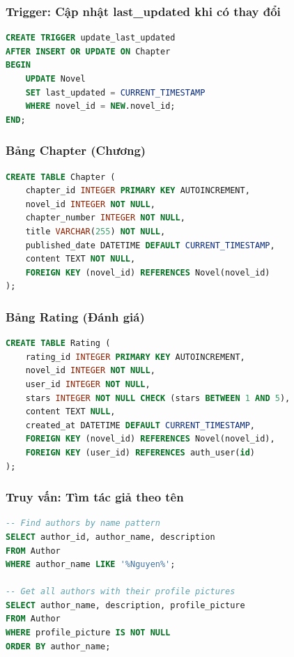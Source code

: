 \documentclass[12pt,aspectratio=169,handout]{beamer}
\begin{document}
\begin{frame}[fragile]
\frametitle{Trigger: Cập nhật last_updated khi có thay đổi}
\begin{lstlisting}[language=SQL, basicstyle=\small\ttfamily]
CREATE TRIGGER update_last_updated
AFTER INSERT OR UPDATE ON Chapter
BEGIN
    UPDATE Novel
    SET last_updated = CURRENT_TIMESTAMP
    WHERE novel_id = NEW.novel_id;
END;
\end{lstlisting}
\end{frame}

\begin{frame}[fragile]
\frametitle{Bảng Chapter (Chương)}
\begin{lstlisting}[language=SQL, basicstyle=\small\ttfamily]
CREATE TABLE Chapter (
    chapter_id INTEGER PRIMARY KEY AUTOINCREMENT,
    novel_id INTEGER NOT NULL,
    chapter_number INTEGER NOT NULL,
    title VARCHAR(255) NOT NULL,
    published_date DATETIME DEFAULT CURRENT_TIMESTAMP,
    content TEXT NOT NULL,
    FOREIGN KEY (novel_id) REFERENCES Novel(novel_id)
);
\end{lstlisting}
\end{frame}

\begin{frame}[fragile]
\frametitle{Bảng Rating (Đánh giá)}
\begin{lstlisting}[language=SQL, basicstyle=\small\ttfamily]
CREATE TABLE Rating (
    rating_id INTEGER PRIMARY KEY AUTOINCREMENT,
    novel_id INTEGER NOT NULL,
    user_id INTEGER NOT NULL,
    stars INTEGER NOT NULL CHECK (stars BETWEEN 1 AND 5),
    content TEXT NULL,
    created_at DATETIME DEFAULT CURRENT_TIMESTAMP,
    FOREIGN KEY (novel_id) REFERENCES Novel(novel_id),
    FOREIGN KEY (user_id) REFERENCES auth_user(id)
);
\end{lstlisting}
\end{frame}

\begin{frame}[fragile]
\frametitle{Truy vấn: Tìm tác giả theo tên}
\begin{lstlisting}[language=SQL, basicstyle=\small\ttfamily]
-- Find authors by name pattern
SELECT author_id, author_name, description 
FROM Author 
WHERE author_name LIKE '%Nguyen%';

-- Get all authors with their profile pictures
SELECT author_name, description, profile_picture
FROM Author 
WHERE profile_picture IS NOT NULL
ORDER BY author_name;
\end{lstlisting}
\end{frame}
\end{document}
